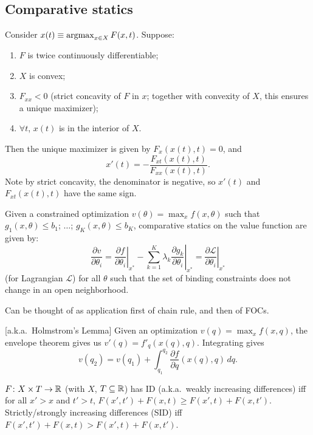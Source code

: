 \documentclass[8pt,letterpaper, landscape]{extarticle} %
\begin{document}
\begin{multicols}{3}
\begin{description}
\subsection{Comparative statics}
 Consider $ x(t) \equiv \operatorname*{argmax}_{x \in X} F(x,t) $. Suppose:
\begin{enumerate}
\item $ F $ is twice continuously differentiable;
\item $ X $ is convex;
\item $ F_{xx} < 0 $ (strict concavity of $ F $ in $ x $; together with convexity of $ X $, this ensures a unique maximizer);
\item $ \forall t $, $ x(t) $ is in the interior of $ X $.
\end{enumerate}
Then the unique maximizer is given by $ F_x (x(t),t)=0 $, and
$$ x'(t) = - \frac{F_{xt}(x(t),t)}{F_{xx}(x(t),t)}. $$
Note by strict concavity, the denominator is negative, so $ x'(t) $ and $ F_{xt}(x(t),t) $ have the same sign.

 Given a constrained optimization $ v(\theta) = \max_{x} f(x,\theta) $ such that $ g_1(x,\theta) \leq b_1 $; $ \dotsc $; $ g_K (x,\theta) \leq b_K $, comparative statics on the value function are given by:
$$ \frac{\partial v}{\partial \theta_i} = \left. \frac{\partial f}{\partial \theta_i} \right|_{x^*} - \sum_{k=1}^{K} \lambda_k \left. \frac{\partial g_k}{\partial \theta_i} \right|_{x^*} = \left. \frac{\partial \mathcal{L}}{\partial \theta_i} \right|_{x^*} $$
(for Lagrangian $ \mathcal{L} $) for all $ \theta $ such that the set of binding constraints does not change in an open neighborhood.

Can be thought of as application first of chain rule, and then of FOCs.

 [a.k.a.\ Holmstrom's Lemma] Given an optimization $ v(q) = \max_{x} f(x,q) $, the envelope theorem gives us $ v'(q) = f'_{q}(x(q),q) $. Integrating gives
$$ v(q_2) = v(q_1) + \int_{q_1}^{q_2} \frac{\partial f}{\partial q} (x(q),q) \, dq. $$

 $ F \colon X \times T \to \mathbb{R} $ (with $ X $, $ T \subseteq \mathbb{R} $) has ID (a.k.a.\ weakly increasing differences) iff for all $ x' > x $ and $ t' > t $, $ F(x', t') + F(x, t) \geq F(x', t) + F(x, t') $. Strictly/strongly increasing differences (SID) iff $ F(x', t') + F(x, t) > F(x', t) + F(x, t') $.


\end{description}
\end{multicols}
\end{document}
